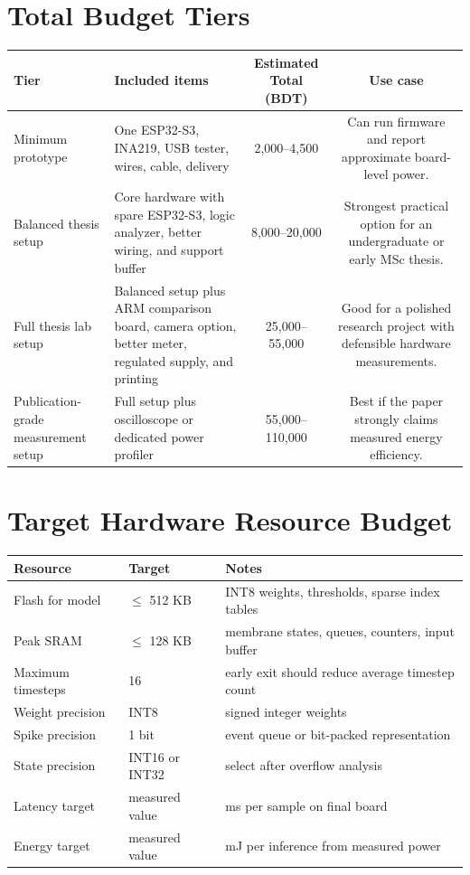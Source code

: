 \documentclass[11pt]{article}
\begin{document}
\section*{Total Budget Tiers}
\begin{tabular}{p{4.0cm}p{6.1cm}cc}
\toprule
Tier & Included items & Estimated Total (BDT) & Use case \\
\midrule
Minimum prototype & One ESP32-S3, INA219, USB tester, wires, cable, delivery & 2,000--4,500 & Can run firmware and report approximate board-level power. \\
Balanced thesis setup & Core hardware with spare ESP32-S3, logic analyzer, better wiring, and support buffer & 8,000--20,000 & Strongest practical option for an undergraduate or early MSc thesis. \\
Full thesis lab setup & Balanced setup plus ARM comparison board, camera option, better meter, regulated supply, and printing & 25,000--55,000 & Good for a polished research project with defensible hardware measurements. \\
Publication-grade measurement setup & Full setup plus oscilloscope or dedicated power profiler & 55,000--110,000 & Best if the paper strongly claims measured energy efficiency. \\
\bottomrule
\end{tabular}

\section*{Target Hardware Resource Budget}
\begin{tabular}{lll}
\toprule
Resource & Target & Notes \\
\midrule
Flash for model & $\leq$ 512 KB & INT8 weights, thresholds, sparse index tables \\
Peak SRAM & $\leq$ 128 KB & membrane states, queues, counters, input buffer \\
Maximum timesteps & 16 & early exit should reduce average timestep count \\
Weight precision & INT8 & signed integer weights \\
Spike precision & 1 bit & event queue or bit-packed representation \\
State precision & INT16 or INT32 & select after overflow analysis \\
Latency target & measured value & ms per sample on final board \\
Energy target & measured value & mJ per inference from measured power \\
\bottomrule
\end{tabular}
\end{document}
